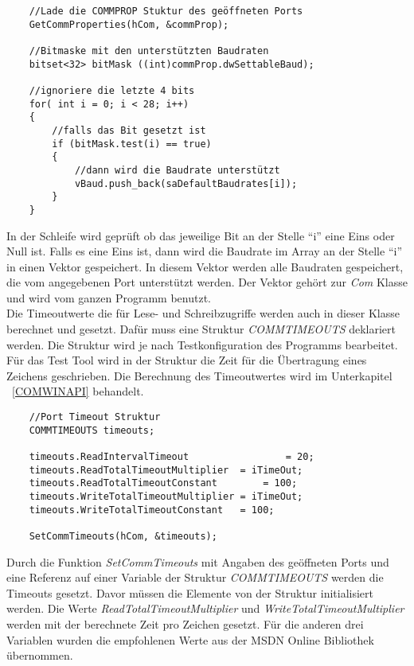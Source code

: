 \begin{lstlisting}
	//Lade die COMMPROP Stuktur des geöffneten Ports	 
	GetCommProperties(hCom, &commProp);
 
 	//Bitmaske mit den unterstützten Baudraten
	bitset<32> bitMask ((int)commProp.dwSettableBaud);
	
	//ignoriere die letzte 4 bits
	for( int i = 0; i < 28; i++)
	{
		//falls das Bit gesetzt ist
		if (bitMask.test(i) == true)
		{
			//dann wird die Baudrate unterstützt
			vBaud.push_back(saDefaultBaudrates[i]);
		}
	}
\end{lstlisting}

In der Schleife wird geprüft ob das jeweilige Bit an der Stelle "`i"' eine Eins oder Null ist. Falls es eine Eins ist, dann wird die Baudrate im Array an der Stelle "`i"' in einen Vektor gespeichert. In diesem Vektor werden alle Baudraten gespeichert, die vom angegebenen Port unterstützt werden. Der Vektor gehört zur \textit{Com} Klasse und wird vom ganzen Programm benutzt.\\

Die Timeoutwerte die für Lese- und Schreibzugriffe werden auch in dieser Klasse berechnet und gesetzt. Dafür muss eine  Struktur \textit{COMMTIMEOUTS} deklariert werden. Die Struktur wird je nach Testkonfiguration des Programms bearbeitet. Für das Test Tool wird in der Struktur die Zeit für die Übertragung eines Zeichens geschrieben. Die Berechnung des Timeoutwertes wird im Unterkapitel ~\ref{COMWINAPI} behandelt.

\begin{lstlisting}
	//Port Timeout Struktur
	COMMTIMEOUTS timeouts;
	
	timeouts.ReadIntervalTimeout				 = 20;
	timeouts.ReadTotalTimeoutMultiplier	 = iTimeOut;
	timeouts.ReadTotalTimeoutConstant		 = 100;
	timeouts.WriteTotalTimeoutMultiplier = iTimeOut;
	timeouts.WriteTotalTimeoutConstant	 = 100;
	
	SetCommTimeouts(hCom, &timeouts);
\end{lstlisting}

Durch die Funktion \textit{SetCommTimeouts} mit Angaben des geöffneten Ports und eine Referenz auf einer Variable der Struktur \textit{COMMTIMEOUTS} werden die Timeouts gesetzt. Davor müssen die Elemente von der Struktur initialisiert werden. Die Werte \textit{ReadTotalTimeoutMultiplier} und \textit{WriteTotalTimeoutMultiplier} werden mit der berechnete Zeit pro Zeichen gesetzt. Für die anderen drei Variablen wurden die empfohlenen Werte aus der MSDN Online Bibliothek\cite{SerialCommunications} übernommen. \\

